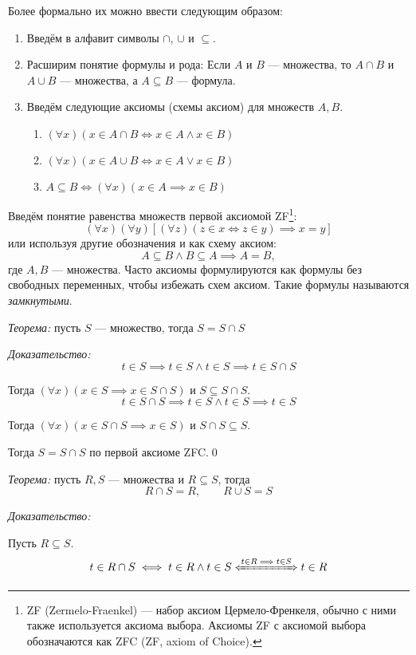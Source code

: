 Более формально их можно ввести следующим образом:
\begin{enumerate}
	\item{}Введём в алфавит символы $\cap$, $\cup$ и $\subseteq$.
	\item{}Расширим понятие формулы и рода: Если $A$ и $B$ --- множества,
	то  $A\cap B$ и $A\cup B$ --- множества, а $A\subseteq B$ --- формула.
	\item{}Введём следующие аксиомы (схемы аксиом) для множеств $A,B$.
	\begin{enumerate}
		\item{}$(\forall x)(x\in A\cap B\iff x\in A\land x\in B)$
		\item{}$(\forall x)(x\in A\cup B\iff x\in A\lor x\in B)$
		\item{}$A\subseteq B \iff (\forall x)(x\in A\implies x\in B)$
	\end{enumerate}
\end{enumerate}

Введём понятие равенства множеств первой аксиомой ZF\footnote{
	ZF (Zermelo-Fraenkel) --- набор аксиом Цермело-Френкеля, обычно с ними также
	используется аксиома выбора. Аксиомы ZF с аксиомой выбора
	обозначаются как ZFC (ZF, axiom of Choice).
}:
\[
	(\forall x)(\forall y)[(\forall z)(z\in x\iff z\in y)\implies x=y]
\]
или используя другие обозначения и как схему аксиом:
\[
	A\subseteq B\land B\subseteq A\implies A=B,
\]
где $A,B$ --- множества. Часто аксиомы формулируются как формулы без
свободных переменных, чтобы избежать схем аксиом.
Такие формулы называются {\it замкнутыми}.

{\it Теорема:} пусть $S$ --- множество, тогда $S=S\cap S$

{\it Доказательство:}
\[
	t\in S\implies t\in S\land t\in S\implies t\in S\cap S
\]

Тогда $(\forall x)(x\in S\implies x\in S\cap S)$ и $S\subseteq S\cap S$.
\[
	t\in S\cap S\implies t\in S\land t\in S\implies t\in S
\]

Тогда $(\forall x)(x\in S\cap S\implies x\in S)$ и $S\cap S\subseteq S$.

Тогда $S=S\cap S$ по первой аксиоме ZFC.\qed

{\it Теорема:} пусть $R,S$ --- множества и $R\subseteq S$, тогда
\[
	R\cap S= R,\qquad R\cup S= S
\]

{\it Доказательство:}

Пусть $R\subseteq S$.
\[
	t\in R\cap S\iff t\in R\land t\in S\xLeftrightarrow{t\in R\implies t\in S} t\in R
\]

